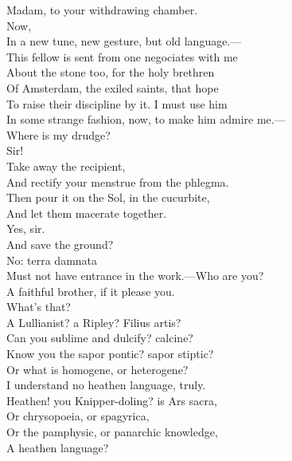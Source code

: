 \documentclass[a4paper,oneside]{memoir}
\begin{document}
\begin{drama*}
Madam, to your withdrawing chamber.\\
 Now,\\
In a new tune, new gesture, but old language.---\\
This fellow is sent from one negociates with me\\
About the stone too, for the holy brethren\\
Of Amsterdam, the exiled saints, that hope\\
To raise their discipline by it. I must use him\\
In some strange fashion, now, to make him admire me.---\\
Where is my drudge?\\
\facespeaks {} Sir!\\
\subtlespeaks {} Take away the recipient,\\
And rectify your menstrue from the phlegma.\\
Then pour it on the Sol, in the cucurbite,\\
And let them macerate together.\\
\facespeaks {} Yes, sir.\\
And save the ground?\\
\subtlespeaks {} No: terra damnata\\
Must not have entrance in the work.---Who are you?\\
\ananiasspeaks A faithful brother, if it please you.\\
\subtlespeaks {} What's that?\\
A Lullianist? a Ripley? Filius artis?\\
Can you sublime and dulcify? calcine?\\
Know you the sapor pontic? sapor stiptic?\\
Or what is homogene, or heterogene?\\
\ananiasspeaks I understand no heathen language, truly.\\
\subtlespeaks Heathen! you Knipper-doling? is Ars sacra,\\
Or chrysopoeia, or spagyrica,\\
Or the pamphysic, or panarchic knowledge,\\
A heathen language?\\

\end{drama*}
\end{document}

